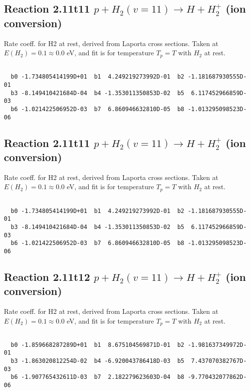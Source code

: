 \documentclass[12pt,dvipdfmx]{article}
\begin{document}
\newpage
\subsection{
Reaction 2.11t11
$ p + H_2(v=11) \rightarrow H + H_2^+$ (ion conversion)
}
Rate coeff. for H2 at rest, derived from Laporta cross sections.
Taken at $E(H_2) = 0.1 \approx 0.0$ eV,  and fit is for temperature $T_p=T$ with $H_2$ at rest.

\begin{small}\begin{verbatim}

  b0 -1.734805414199D+01  b1  4.249219273992D-01  b2 -1.181687930555D-01
  b3 -8.149410421684D-04  b4 -1.353011350853D-02  b5  6.117452966859D-03
  b6 -1.021422506952D-03  b7  6.860946632810D-05  b8 -1.013295098523D-06

\end{verbatim}\end{small}

\newpage
\subsection{
Reaction 2.11t11
$ p + H_2(v=11) \rightarrow H + H_2^+$ (ion conversion)
}
Rate coeff. for H2 at rest, derived from Laporta cross sections.
Taken at $E(H_2) = 0.1 \approx 0.0$ eV,  and fit is for temperature $T_p=T$ with $H_2$ at rest.

\begin{small}\begin{verbatim}

  b0 -1.734805414199D+01  b1  4.249219273992D-01  b2 -1.181687930555D-01
  b3 -8.149410421684D-04  b4 -1.353011350853D-02  b5  6.117452966859D-03
  b6 -1.021422506952D-03  b7  6.860946632810D-05  b8 -1.013295098523D-06

\end{verbatim}\end{small}

\newpage
\subsection{
Reaction 2.11t12
$ p + H_2(v=11) \rightarrow H + H_2^+$ (ion conversion)
}
Rate coeff. for H2 at rest, derived from Laporta cross sections.
Taken at $E(H_2) = 0.1 \approx 0.0$ eV,  and fit is for temperature $T_p=T$ with $H_2$ at rest.

\begin{small}\begin{verbatim}

  b0 -1.859668287289D+01  b1  8.675104569871D-01  b2 -1.981637349972D-01
  b3 -1.863020812254D-02  b4 -6.920043786418D-03  b5  7.437070382767D-03
  b6 -1.907765432611D-03  b7  2.182279623603D-04  b8 -9.770432077862D-06

\end{verbatim}\end{small}
\end{document}
